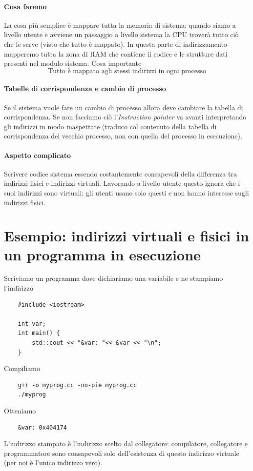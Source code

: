 \paragraph{Cosa faremo} La cosa più semplice è mappare tutta la memoria di sistema: quando siamo a livello utente e avviene un passaggio a livello sistema la CPU troverà tutto ciò che le serve (visto che tutto è mappato). In questa parte di indirizzamento mapperemo tutta la zona di RAM che contiene il codice e le strutture dati presenti nel modulo sistema. Cosa importante
\[\boxed{\text{Tutto è mappato agli stessi indirizzi in ogni processo}}\]
\paragraph{Tabelle di corrispondenza e cambio di processo} Se il sistema vuole fare un cambio di processo allora deve cambiare la tabella di corrispondenza. Se non facciamo ciò l'\textit{Instruction pointer} va avanti interpretando gli indirizzi in modo inaspettate (traduco col contenuto della tabella di corrispondenza del vecchio processo, non con quella del processo in esecuzione).

\paragraph{Aspetto complicato} Scrivere codice sistema essendo costantemente consapevoli della differenza tra indirizzi fisici e indirizzi virtuali. Lavorando a livello utente questo ignora che i suoi indirizzi sono virtuali: gli utenti usano solo questi e non hanno interesse sugli indirizzi fisici.

\section{Esempio: indirizzi virtuali e fisici in un programma in esecuzione} 
Scriviamo un programma dove dichiariamo una variabile e ne stampiamo l'indirizzo
\begin{verbatim}
	#include <iostream>
	
	int var;
	int main() {
		std::cout << "&var: "<< &var << "\n";
	}
\end{verbatim}
Compiliamo
\begin{verbatim}
	g++ -o myprog.cc -no-pie myprog.cc
	./myprog
\end{verbatim} 
Otteniamo
\begin{verbatim}
	&var: 0x404174
\end{verbatim}
L'indirizzo stampato è l'indirizzo scelto dal collegatore: compilatore, collegatore e programmatore sono consapevoli solo dell'esistenza di questo indirizzo virtuale (per noi è l'unico indirizzo vero).

